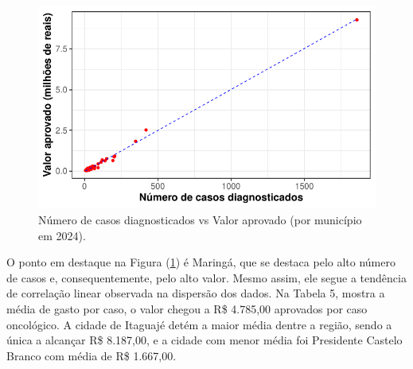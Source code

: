 \documentclass[a4paper]{modeloLEA} %
\begin{document}
\begin{figure}[h]

{\centering \includegraphics{relatorio_files/figure-latex/dispersao1-1} 

}

\caption{\label{fig:dispersao1}Número de casos diagnosticados vs Valor aprovado (por município em 2024).}\label{fig:dispersao1}
\end{figure}

\begin{table}[!h]
\centering
\caption{\label{tab:media}Média de valor aprovado por caso oncológico: maior, menor e geral da região.}
\centering
{}
\end{table}

O ponto em destaque na Figura (\ref{fig:dispersao1}) é Maringá, que se destaca pelo alto número de casos e, consequentemente, pelo alto valor. Mesmo assim, ele segue a tendência de correlação linear observada na dispersão dos dados. Na Tabela 5, mostra a média de gasto por caso, o valor chegou a R\$ 4.785,00 aprovados por caso oncológico. A cidade de Itaguajé detém a maior média dentre a região, sendo a única a alcançar R\$ 8.187,00, e a cidade com menor média foi Presidente Castelo Branco com média de R\$ 1.667,00.
\end{document}
